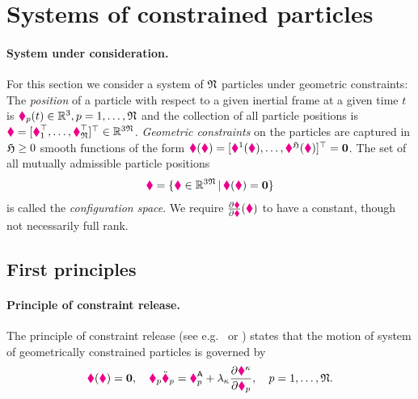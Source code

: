 \section{Systems of constrained particles}

\paragraph{System under consideration.} For this section we consider a system of $\numParticles$ particles under geometric constraints:
The \textit{position} of a particle with respect to a given inertial frame at a given time $t$ is $\particlePos{\PidxI}(t) \in \RealNum^3, \PidxI = 1,\ldots,\numParticles$ and the collection of all particle positions is $\particleCoord = [\particlePos{1}^\top,\ldots,\particlePos{\numParticles}^\top]^\top \in \RealNum^{3\numParticles}$.
\textit{Geometric constraints} on the particles are captured in $\numParticleConstraints \geq 0$ smooth functions of the form $\particleGeoConstraint(\particleCoord) = [\particleGeoConstraintCoeff{1}(\particleCoord), \ldots, \particleGeoConstraintCoeff{\numParticleConstraints}(\particleCoord)]^\top = \tuple{0}$.
The set of all mutually admissible particle positions 
\begin{align}
\particleConfigSpace = \{ \particleCoord \in \RealNum^{3\numParticles} \, | \, \particleGeoConstraint(\particleCoord) = \tuple{0} \} 
\end{align}
is called the \textit{configuration space}.
We require $\pdiff[\particleGeoConstraint]{\particleCoord}(\particleCoord)$ to have a constant, though not necessarily full rank.

\subsection{First principles}
\paragraph{Principle of constraint release.} 
The principle of constraint release (see e.g.\ \cite[sec.\ 32]{Hamel:TheoretischeMechanik} or \cite[sec.\ 6.1]{Lurie:AnalyticalMechanics}) states that the motion of system of geometrically constrained particles is governed by
\begin{align}\label{eq:ConstraintRelease}
 \particleGeoConstraint(\particleCoord) = \tuple{0}, 
\quad
 \particleMass{\PidxI} \particlePosdd{\PidxI} = \particleForceImpressed{\PidxI} + \LagrangeMultCoeff{\CidxI} \pdiff[\particleGeoConstraintCoeff{\CidxI}]{\particlePos{\PidxI}},
\quad \PidxI = 1,\ldots,\numParticles.
\end{align}


